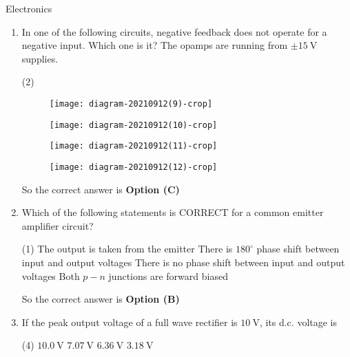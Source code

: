 \begin{abox}
	 Electronics
	\end{abox}
\begin{enumerate}
	\item In one of the following circuits, negative feedback does not operate for a negative input. Which one is it? The opamps are running from $\pm 15 \mathrm{~V}$ supplies.
\begin{tasks}(2)
\task[\textbf{A.}] \begin{figure}[H]
	\centering
	\texttt{[image: diagram-20210912(9)-crop]}
\end{figure}
\task[\textbf{B.}] \begin{figure}[H]
	\centering
	\texttt{[image: diagram-20210912(10)-crop]}
\end{figure}
\task[\textbf{C.}] \begin{figure}[H]
	\centering
	\texttt{[image: diagram-20210912(11)-crop]}
\end{figure}
\task[\textbf{D.}] \begin{figure}[H]
	\centering
	\texttt{[image: diagram-20210912(12)-crop]}
\end{figure}
\end{tasks}
\begin{answer}
So the correct answer is \textbf{Option (C)}
\end{answer}
	\item Which of the following statements is CORRECT for a common emitter amplifier circuit?
\begin{tasks}(1)
\task[\textbf{A.}] The output is taken from the emitter
\task[\textbf{B.}] There is $180^{\circ}$ phase shift between input and output voltages
\task[\textbf{C.}] There is no phase shift between input and output voltages
\task[\textbf{D.}] Both $p-n$ junctions are forward biased
\end{tasks}
\begin{answer}
So the correct answer is \textbf{Option (B)}
\end{answer}
	\item If the peak output voltage of a full wave rectifier is $10 \mathrm{~V}$, its d.c. voltage is
\begin{tasks}(4)
\task[\textbf{A.}] $10.0 \mathrm{~V}$
\task[\textbf{B.}] $7.07 \mathrm{~V}$
\task[\textbf{C.}] $6.36 \mathrm{~V}$
\task[\textbf{D.}] $3.18 \mathrm{~V}$
\end{tasks}
\begin{answer}

\end{answer}
\end{enumerate}
